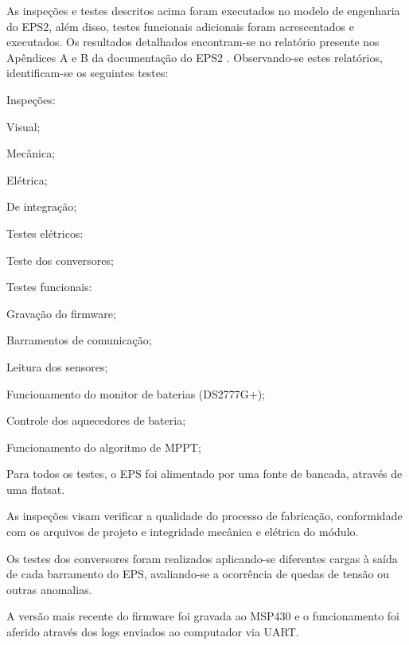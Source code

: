As inspeções e testes descritos acima foram executados no modelo de engenharia do \gls{EPS2}, além disso, testes funcionais adicionais foram acrescentados e executados. Os resultados detalhados encontram-se no relatório presente nos Apêndices A e B da documentação do \gls{EPS2} \cite{eps2-doc}. Observando-se estes relatórios, identificam-se os seguintes testes:

\begin{alineas}
    \item Inspeções:
    \begin{alineas}
        \item Visual;
        \item Mecânica;
        \item Elétrica;
        \item De integração;
    \end{alineas}
    \item Testes elétricos:
    \begin{alineas}
        \item Teste dos conversores;
    \end{alineas}
    \item Testes funcionais:
    \begin{alineas}
        \item Gravação do firmware;
        \item Barramentos de comunicação;
        \item Leitura dos sensores;
        \item Funcionamento do monitor de baterias (DS2777G+);
        \item Controle dos aquecedores de bateria;
        \item Funcionamento do algoritmo de \gls{MPPT};
    \end{alineas}
\end{alineas}

Para todos os testes, o \gls{EPS} foi alimentado por uma fonte de bancada, através de uma flatsat.

As inspeções visam verificar a qualidade do processo de fabricação, conformidade com os arquivos de projeto e integridade mecânica e elétrica do módulo.

Os testes dos conversores foram realizados aplicando-se diferentes cargas à saída de cada barramento do \gls{EPS}, avaliando-se a ocorrência de quedas de tensão ou outras anomalias.

A versão mais recente do firmware foi gravada ao MSP430 e o funcionamento foi aferido através dos logs enviados ao computador via \gls{UART}.

